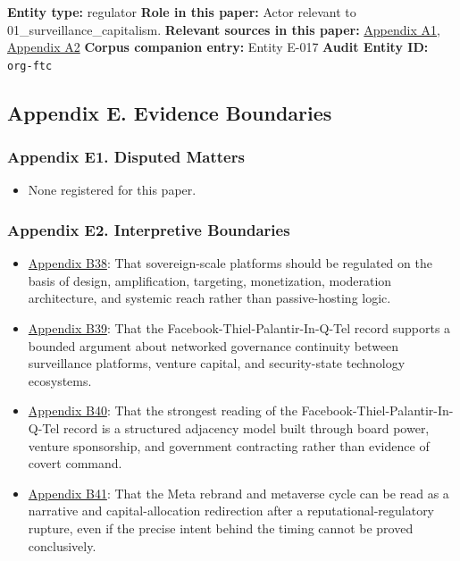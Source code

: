 \documentclass[
  american,
  11pt,
  letterpaper,
]{article}
\providecommand{\tightlist}{%
  \setlength{\itemsep}{0pt}\setlength{\parskip}{0pt}}
\begin{document}
\textbf{Entity type:} regulator \textbf{Role in this paper:} Actor
relevant to 01\_surveillance\_capitalism. \textbf{Relevant sources in
this paper:}
\hyperref[ch-01-appendix-a1-a-look-behind-the-screens-examining-the-data-practices-of-social-media-and-video-streaming-services]{Appendix
A1},
\hyperref[ch-01-appendix-a2-ftc-imposes-5-billion-penalty-and-sweeping-new-privacy-restrictions-on-facebook]{Appendix
A2} \textbf{Corpus companion entry:} Entity E-017 \textbf{Audit Entity
ID:} \texttt{org-ftc}

\subsection{Appendix E. Evidence
Boundaries}\label{appendix-e.-evidence-boundaries-1}

\subsubsection{Appendix E1. Disputed
Matters}\label{ch-01-appendix-e1-disputed-matters}

\begin{itemize}
\tightlist
\item
  None registered for this paper.
\end{itemize}

\subsubsection{Appendix E2. Interpretive
Boundaries}\label{ch-01-appendix-e2-interpretive-boundaries}

\begin{itemize}
\tightlist
\item
  \hyperref[ch-01-appendix-b38-sovereign-scale-platforms-should-be-regulated-on-the-basis-of-design-amplificati]{Appendix
  B38}: That sovereign-scale platforms should be regulated on the basis
  of design, amplification, targeting, monetization, moderation
  architecture, and systemic reach rather than passive-hosting logic.
\item
  \hyperref[ch-01-appendix-b39-the-facebook-thiel-palantir-in-q-tel-record-supports-a-bounded-argument-about-net]{Appendix
  B39}: That the Facebook-Thiel-Palantir-In-Q-Tel record supports a
  bounded argument about networked governance continuity between
  surveillance platforms, venture capital, and security-state technology
  ecosystems.
\item
  \hyperref[ch-01-appendix-b40-the-strongest-reading-of-the-facebook-thiel-palantir-in-q-tel-record-is-a-structu]{Appendix
  B40}: That the strongest reading of the
  Facebook-Thiel-Palantir-In-Q-Tel record is a structured adjacency
  model built through board power, venture sponsorship, and government
  contracting rather than evidence of covert command.
\item
  \hyperref[ch-01-appendix-b41-the-meta-rebrand-and-metaverse-cycle-can-be-read-as-a-narrative-and-capital-alloc]{Appendix
  B41}: That the Meta rebrand and metaverse cycle can be read as a
  narrative and capital-allocation redirection after a
  reputational-regulatory rupture, even if the precise intent behind the
  timing cannot be proved conclusively.
\end{itemize}
\end{document}
